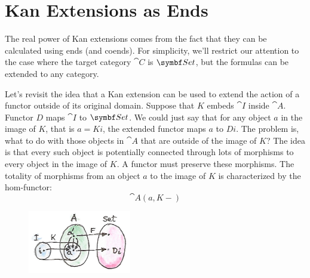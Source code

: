 \section{Kan Extensions as Ends}

The real power of Kan extensions comes from the fact that they can be
calculated using ends (and coends). For simplicity, we'll restrict our
attention to the case where the target category $\cat{C}$ is
$\Set$, but the formulas can be extended to any category.

Let's revisit the idea that a Kan extension can be used to extend the
action of a functor outside of its original domain. Suppose that
$K$ embeds $\cat{I}$ inside $\cat{A}$. Functor $D$ maps
$\cat{I}$ to $\Set$. We could just say that for any object
$a$ in the image of $K$, that is $a = K i$, the
extended functor maps $a$ to $D i$. The problem is, what
to do with those objects in $\cat{A}$ that are outside of the image of
$K$? The idea is that every such object is potentially connected
through lots of morphisms to every object in the image of $K$. A
functor must preserve these morphisms. The totality of morphisms from an
object $a$ to the image of $K$ is characterized by the
hom-functor:
\[\cat{A}(a, K -)\]

\begin{figure}[H]
  \centering
  \includegraphics[width=0.4\textwidth]{images/kan13.jpg}
\end{figure}

